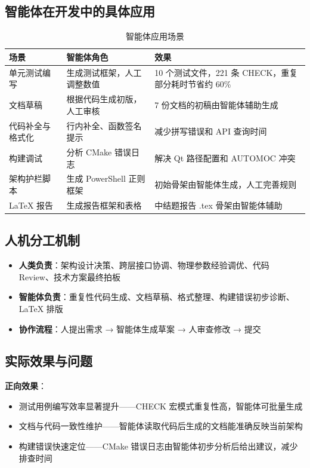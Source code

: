 \documentclass[11pt]{ctexart}
\begin{document}
\subsection{智能体在开发中的具体应用}

\begin{table}[H]
\centering\small
\begin{tabular}{|p{2.8cm}|p{3.2cm}|p{5.5cm}|}
\hline
\textbf{场景} & \textbf{智能体角色} & \textbf{效果} \\
\hline
单元测试编写 & 生成测试框架，人工调整数值 & 10 个测试文件，221 条 CHECK，重复部分耗时节省约 60\% \\
文档草稿 & 根据代码生成初版，人工审核 & 7 份文档的初稿由智能体辅助生成 \\
代码补全与格式化 & 行内补全、函数签名提示 & 减少拼写错误和 API 查询时间 \\
构建调试 & 分析 CMake 错误日志 & 解决 Qt 路径配置和 AUTOMOC 冲突 \\
架构护栏脚本 & 生成 PowerShell 正则框架 & 初始骨架由智能体生成，人工完善规则 \\
LaTeX 报告 & 生成报告框架和表格 & 中结题报告 .tex 骨架由智能体辅助 \\
\hline
\end{tabular}
\caption{智能体应用场景}
\end{table}

\subsection{人机分工机制}

\begin{itemize}
\item \textbf{人类负责}：架构设计决策、跨层接口协调、物理参数经验调优、代码 Review、技术方案最终拍板
\item \textbf{智能体负责}：重复性代码生成、文档草稿、格式整理、构建错误初步诊断、LaTeX 排版
\item \textbf{协作流程}：人提出需求 → 智能体生成草案 → 人审查修改 → 提交
\end{itemize}

\subsection{实际效果与问题}

\textbf{正向效果}：
\begin{itemize}
\item 测试用例编写效率显著提升——CHECK 宏模式重复性高，智能体可批量生成
\item 文档与代码一致性维护——智能体读取代码后生成的文档能准确反映当前架构
\item 构建错误快速定位——CMake 错误日志由智能体初步分析后给出建议，减少排查时间
\end{itemize}
\end{document}
